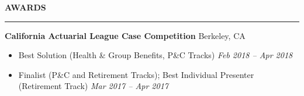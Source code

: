 \documentclass[11pt,letterpaper]{article}
\newcommand{\sectline}{\vspace{4pt}\hrule height 1.5pt\vspace{4pt}}
\newcommand{\sectspace}{\vspace{10pt}}
\newcommand{\smallspace}{\vspace{5pt}}
\begin{document}
\textbf{AWARDS} \sectline
\textbf{California Actuarial League Case Competition} \hfill Berkeley, CA \\
\begin{itemize}
\item Best Solution (Health \& Group Benefits, P\&C Tracks) \hfill \textit{Feb 2018 -- Apr 2018} \\
\item Finalist (P\&C and Retirement Tracks); Best Individual Presenter (Retirement Track) \hfill \textit{Mar 2017 -- Apr 2017}
\end{itemize}

\sectspace
\end{document}
